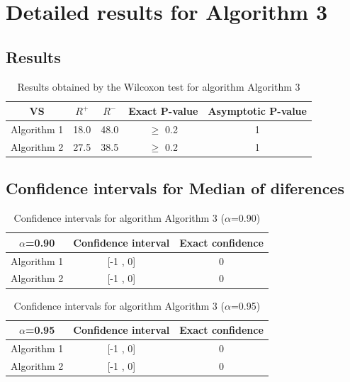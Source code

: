 \documentclass[a4paper,10pt]{article}
\begin{document}
 \clearpage 


\section{Detailed results for Algorithm 3}


\subsection{Results}

\begin{table}[!htp]
\centering\small
\begin{tabular}{
|c|c|c|c|c|}
\hline
 VS & $R^{+}$ & $R^{-}$ & Exact P-value & Asymptotic P-value \\ \hline 
Algorithm 1 & 18.0 & 48.0 & $\geq$ 0.2 & 1\\ \hline 
Algorithm 2 & 27.5 & 38.5 & $\geq$ 0.2 & 1\\ \hline 

\end{tabular}
\caption{Results obtained by the Wilcoxon test for algorithm Algorithm 3}
\end{table}

\subsection{Confidence intervals for Median of diferences}

\begin{table}[!htp]
\centering\small
\begin{tabular}{
|c|c|c|}
\hline
 $\alpha$=0.90 & Confidence interval & Exact confidence \\ \hline 
Algorithm 1 & [-1 , 0] & 0\\ \hline 
Algorithm 2 & [-1 , 0] & 0\\ \hline 

\end{tabular}
\caption{Confidence intervals for algorithm Algorithm 3 ($\alpha$=0.90)}
\end{table}
\begin{table}[!htp]
\centering\small
\begin{tabular}{
|c|c|c|}
\hline
 $\alpha$=0.95 & Confidence interval & Exact confidence \\ \hline 
Algorithm 1 & [-1 , 0] & 0\\ \hline 
Algorithm 2 & [-1 , 0] & 0\\ \hline 

\end{tabular}
\caption{Confidence intervals for algorithm Algorithm 3 ($\alpha$=0.95)}
\end{table}

 \clearpage 
\end{document}
